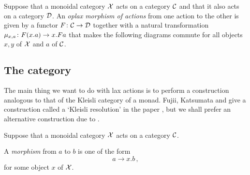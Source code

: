 \documentclass{article}
\begin{document}
\begin{definition}
  \label{DefOplaxMorphismOfActions}
  Suppose that a monoidal category $\mathcal X$ acts on a category ${\mathcal{C}}$ and that it also acts on a category ${\mathcal{D}}$.  
  An \emph{oplax morphism of actions} from one action to the other is given by a functor $F \colon {\mathcal{C}} \to {\mathcal{D}}$ together with a natural transformation $\mu_{x,a} \colon F(x.a) \to x.Fa$ that makes the following diagrams commute for all objects $x,y$ of $\mathcal X$ and $a$ of ${\mathcal{C}}$.
\end{definition}

\subsection{The \Mellies category}

The main thing we want to do with lax actions is to perform a construction analogous to that of the Kleisli category of a monad.  
Fujii, Katsumata and \Mellies give a construction called a `Kleisli resolution' in the paper \cite{KleisliResolution}, but we shall prefer an alternative construction due to \Mellies.

Suppose that a monoidal category $\mathcal X$ acts on a category ${\mathcal{C}}$.
\begin{definition}
  A \emph{\Mellies morphism} from $a$ to $b$ is one of the form
  \[
    a \to x.b\,,
    \]
  for some object $x$ of $\mathcal X$.
\end{definition}
\end{document}

